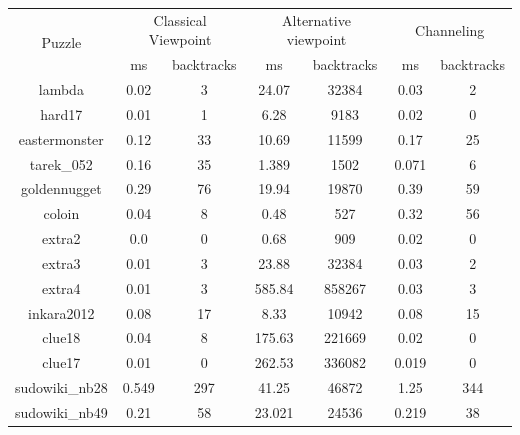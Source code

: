 \documentclass{report}
\begin{document}
\begin{table}[h!]
  \begin{tabular}{|c|c|c|c|c|c|c|}
    \hline
    \multirow{2}{*}{Puzzle} &
    \multicolumn{2}{L|}{Classical Viewpoint} &
    \multicolumn{2}{L|}{Alternative viewpoint} &
    \multicolumn{2}{L|}{Channeling} \\
    & ms & backtracks & ms & backtracks & ms & backtracks \\
    \hline
        lambda & 0.02 & 3 & 24.07 & 32384 & 0.03 & 2 \\
        hard17 & 0.01 & 1 & 6.28 & 9183 & 0.02 & 0 \\
        eastermonster & 0.12 & 33 & 10.69 & 11599 & 0.17 & 25 \\
        tarek\_052 & 0.16 & 35 & 1.389 & 1502 & 0.071 & 6 \\
        goldennugget & 0.29 & 76 & 19.94 & 19870 & 0.39 & 59 \\
        coloin & 0.04 & 8 & 0.48 & 527 & 0.32 & 56 \\
        extra2 & 0.0 & 0 & 0.68 & 909 & 0.02 & 0 \\
        extra3 & 0.01 & 3 & 23.88 & 32384 & 0.03 & 2 \\
        extra4 & 0.01 & 3 & 585.84 & 858267 & 0.03 & 3 \\
        inkara2012 & 0.08 & 17 & 8.33 & 10942 & 0.08 & 15 \\
        clue18 & 0.04 & 8 & 175.63 & 221669 & 0.02 & 0 \\
        clue17 & 0.01 & 0 & 262.53 & 336082 & 0.019 & 0 \\
        sudowiki\_nb28 & 0.549 & 297 & 41.25 & 46872 & 1.25 & 344 \\
        sudowiki\_nb49 & 0.21 & 58 & 23.021 & 24536 & 0.219 & 38 \\
    \hline
  \end{tabular}
\end{table}
\end{document}
